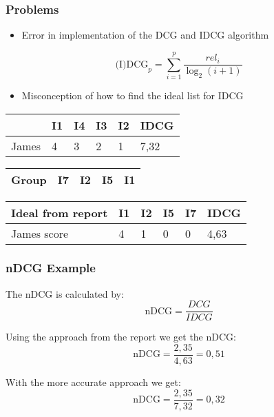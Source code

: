 \begin{frame}
	\frametitle{Problems}
	\begin{itemize}
		\item Error in implementation of the DCG and IDCG algorithm
	\end{itemize}

	\begin{equation}\label{eq:background_dcg}
	\text{(I)DCG}_p = \sum_{i=1}^{p}\frac{\textit{rel}_i}{\log_2(i + 1)}
	\end{equation}	
	
	\begin{itemize}
		\item Misconception of how to find the ideal list for IDCG
	\end{itemize}
	
	\begin{table}[h]
		\centering
		\begin{minipage}{.48\textwidth}\centering
			\begin{tabular}{|l|llll|l|}
				\hline
						& I1 & I4 & I3  & I2 & IDCG   \\ \hline
				James	& 4  & 3  & 2 	& 1	 & 7,32			\\ \hline
			\end{tabular}
		\end{minipage}
		\hfill
		\begin{minipage}{.48\textwidth}\centering
			\begin{tabular}{|l|llll|}
				\hline
				Group	& I7 & I2 & I5  & I1    \\ \hline
			\end{tabular}
		\end{minipage}
	\end{table}
	
	\begin{table}[h]
		\begin{tabular}{|l|llll|l|}
			\hline
			Ideal from report	& I1 & I2 & I5  & I7 & IDCG   \\ \hline
			James score			& 4	 & 1  &	0	& 0	 & 4,63	  \\
			\hline
		\end{tabular}
	\end{table}
\end{frame}


\begin{frame}
	\frametitle{nDCG Example}
	The nDCG is calculated by:
	\begin{equation}\label{eq:background_dcg}
		\text{nDCG} = \frac{DCG}{IDCG}
	\end{equation}			

	Using the approach from the report we get the nDCG:
	\begin{equation}\label{eq:background_dcg}
		\text{nDCG} = \frac{2,35}{4,63} = 0,51
	\end{equation}
	
	With the more accurate approach we get:
	\begin{equation}\label{eq:background_dcg}
		\text{nDCG} = \frac{2,35}{7,32} = 0,32
	\end{equation}
		
\end{frame}

